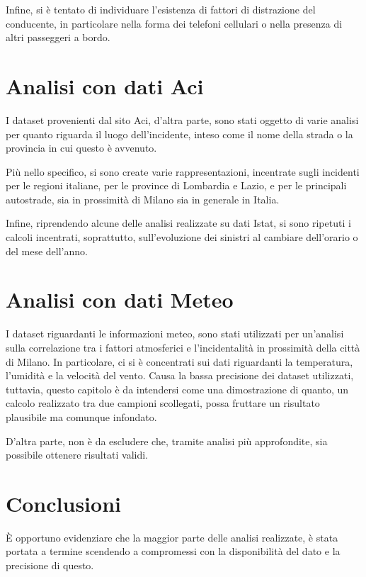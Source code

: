 \documentclass[a4paper]{article}
\begin{document}
Infine, si è tentato di individuare l'esistenza di fattori di distrazione del 
conducente, in particolare nella forma dei telefoni cellulari o nella presenza 
di altri passeggeri a bordo. 

\section{Analisi con dati Aci}

I dataset provenienti dal sito Aci, d'altra parte, sono stati oggetto di varie analisi per 
quanto riguarda il luogo dell'incidente, inteso come il nome della strada o la provincia 
in cui questo è avvenuto. 

Più nello specifico, si sono create varie rappresentazioni, incentrate sugli incidenti 
per le regioni italiane, per le province di Lombardia e Lazio, e per le 
principali autostrade, sia in prossimità di Milano sia in generale in Italia. 

Infine, riprendendo alcune delle analisi realizzate su dati Istat, si sono ripetuti i 
calcoli incentrati, soprattutto, sull'evoluzione dei sinistri al cambiare dell'orario 
o del mese dell'anno.

\section{Analisi con dati Meteo}

I dataset riguardanti le informazioni meteo, sono stati utilizzati per un'analisi sulla 
correlazione tra i fattori atmosferici e l'incidentalità in 
prossimità della città di Milano. 
In particolare, ci si è concentrati sui dati riguardanti la temperatura, 
l'umidità e la velocità del vento. 
Causa la bassa precisione dei dataset utilizzati, tuttavia, questo capitolo è 
da intendersi come una dimostrazione di quanto, un calcolo realizzato tra due campioni 
scollegati, possa fruttare un risultato plausibile ma comunque infondato. 

D'altra parte, non è da escludere che, tramite analisi più approfondite, 
sia possibile ottenere risultati validi.

\section{Conclusioni}

\`E opportuno evidenziare che la maggior parte delle analisi realizzate, 
è stata portata a termine scendendo a compromessi con la disponibilità del dato e la 
precisione di questo. 
\end{document}
